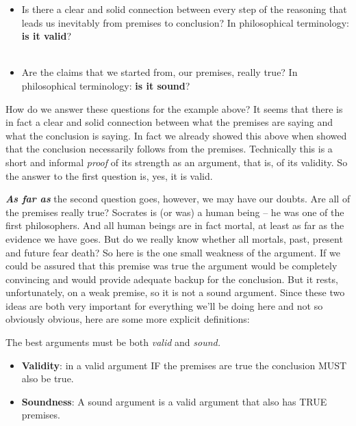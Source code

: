 \documentclass[12pt, openany]{book}
\makeatletter
\providecommand{\tightlist}{%
  \setlength{\itemsep}{0pt}\setlength{\parskip}{0pt}}
\newenvironment{kframe}{%
\medskip{}
\setlength{\fboxsep}{.8em}
 \def\at@end@of@kframe{}%
 \ifinner\ifhmode%
  \def\at@end@of@kframe{\end{minipage}}%
  \begin{minipage}{\columnwidth}%
 \fi\fi%
 \def\FrameCommand##1{\hskip\@totalleftmargin \hskip-\fboxsep
 \colorbox{shadecolor}{##1}\hskip-\fboxsep
     \hskip-\linewidth \hskip-\@totalleftmargin \hskip\columnwidth}%
 \MakeFramed {\advance\hsize-\width
   \@totalleftmargin\z@ \linewidth\hsize
   \@setminipage}}%
 {\par\unskip\endMakeFramed%
 \at@end@of@kframe}
\newenvironment{rmdblock}[1]
  {
  \begin{itemize}
  \renewcommand{\labelitemi}{
    \raisebox{-.7\height}[0pt][0pt]{
      {\setkeys{Gin}{width=3em,keepaspectratio}\texttt{[image: img/\#1]}}
    }
  }
  \setlength{\fboxsep}{1em}
  \begin{kframe}
  \item
  }
  {
  \end{kframe}
  \end{itemize}
  }
\newenvironment{note}
  {\begin{rmdblock}{note}}
  {\end{rmdblock}}
\newenvironment{caution}
  {\begin{rmdblock}{caution}}
  {\end{rmdblock}}
\makeatother
\begin{document}
\begin{note}

\begin{itemize}
\tightlist
\item
  Is there a clear and solid connection between every step of the reasoning that leads us inevitably from premises to conclusion? In philosophical terminology: \textbf{is it valid}?\\
  ~\\
\item
  Are the claims that we started from, our premises, really true? In philosophical terminology: \textbf{is it sound}?
\end{itemize}

\end{note}

How do we answer these questions for the example above? It seems that there is in fact a clear and solid connection between what the premises are saying and what the conclusion is saying. In fact we already showed this above when showed that the conclusion necessarily follows from the premises. Technically this is a short and informal \emph{proof} of its strength as an argument, that is, of its validity. So the answer to the first question is, yes, it is valid.

\textbf{\emph{As far as}} the second question goes, however, we may have our doubts. Are all of the premises really true? Socrates is (or was) a human being -- he was one of the first philosophers. And all human beings are in fact mortal, at least as far as the evidence we have goes. But do we really know whether all mortals, past, present and future fear death? So here is the one small weakness of the argument. If we could be assured that this premise was true the argument would be completely convincing and would provide adequate backup for the conclusion. But it rests, unfortunately, on a weak premise, so it is not a sound argument. Since these two ideas are both very important for everything we'll be doing here and not so obviously obvious, here are some more explicit definitions:

\begin{caution}

The best arguments must be both \emph{valid} and \emph{sound.}

\begin{itemize}
\item
  \textbf{Validity}: in a valid argument IF the premises are true the conclusion MUST also be true.
\item
  \textbf{Soundness}: A sound argument is a valid argument that also has TRUE premises.
\end{itemize}

\end{caution}
\end{document}
